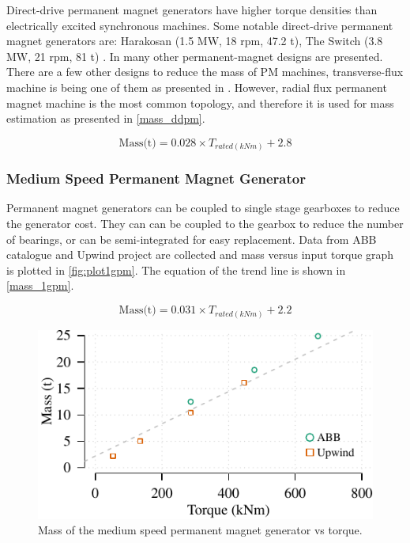 \documentclass{article}\usepackage{graphicx, color}
\makeatletter
\def\maxwidth{ %
  \ifdim\Gin@nat@width>\linewidth
    \linewidth
  \else
    \Gin@nat@width
  \fi
}
\newenvironment{knitrout}{}{} %
\makeatother
\begin{document}
Direct-drive permanent magnet generators have higher torque densities than electrically excited synchronous machines. Some notable direct-drive permanent magnet generators are: Harakosan (1.5 MW, 18 rpm, 47.2 t), The Switch (3.8 MW, 21 rpm, 81 t) \cite{Duan2009}. In \cite{Bang2008,upwind2011} many other permanent-magnet designs are presented. There are a few other designs to reduce the mass of PM machines, transverse-flux machine is being one of them as presented in \cite{Bang2009}. However, radial flux permanent magnet machine is the most common topology, and therefore it is used for mass estimation as presented in \autoref{mass_ddpm}.

\begin{equation}
  \text{Mass(t)} = 0.028 \times {T_{rated(kNm)}} + 2.8
  \label{mass_ddpm}
\end{equation}


\subsubsection{Medium Speed Permanent Magnet Generator}

Permanent magnet generators can be coupled to single stage gearboxes to reduce the generator cost. They can can be coupled to the gearbox to reduce the number of bearings, or can be semi-integrated for easy replacement. Data from ABB catalogue \cite{ABB2012} and Upwind project are collected and mass versus input torque graph is plotted in \autoref{fig:plot1gpm}. The equation of the trend line is shown in \autoref{mass_1gpm}. 

\begin{equation}
  \text{Mass(t)} = 0.031 \times {T_{rated(kNm)}} + 2.2
  \label{mass_1gpm}
\end{equation}

\begin{knitrout}
\color{fgcolor}\begin{figure}[]

\includegraphics[width=\maxwidth]{figure/plot1gpm} \caption[Mass of the medium speed permanent magnet generator vs torque]{Mass of the medium speed permanent magnet generator vs torque.\label{fig:plot1gpm}}
\end{figure}


\end{knitrout}
\end{document}

